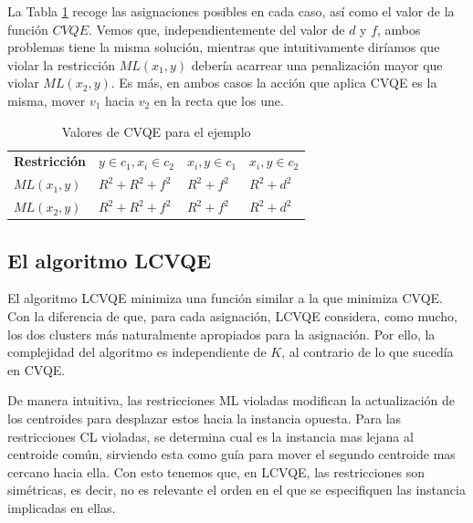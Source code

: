 La Tabla \ref{tab:tabla3} recoge las asignaciones posibles en cada caso, así como el valor de la función $CVQE$. Vemos que, independientemente del valor de $d$ y $f$, ambos problemas tiene la misma solución, mientras que intuitivamente diríamos que violar la restricción $ML(x_1, y)$ debería acarrear una penalización mayor que violar $ML(x_2, y)$. Es más, en ambos casos la acción que aplica \acs{CVQE} es la misma, mover $v_1$ hacia $v_2$ en la recta que los une.

\begin{table}[!h]
	\centering
	\setlength{\arrayrulewidth}{1mm}
	\setlength{\tabcolsep}{10pt}
	\renewcommand{\arraystretch}{0.9}
	
	\begin{tabular}{ >{\centering\arraybackslash}m{2cm}  >{\centering\arraybackslash}m{2.5cm}>{\centering\arraybackslash}m{2cm}>{\centering\arraybackslash}m{2cm}}
		\hline
		\rowcolor{black}
		\multicolumn{4}{c}{\bf \color{white}{Valores de CVQE}}\\
		\hline
		\rowcolor{gray!50}
		\textbf{Restricción} & \textbf{$y \in c_1, x_i \in c_2$} & \textbf{$x_i,y \in c_1$} & \textbf{$x_i,y \in c_2$}  \\
		$ML(x_1, y)$ & $R^2 + R^2 + f^2$ & $R^2 + f^2 $ & $R^2 + d^2 $  \\
		$ML(x_2, y)$ & $R^2 + R^2 + f^2$ & $R^2 + f^2 $ & $R^2 + d^2 $  \\
		\hline
		
	\end{tabular}
	\caption[Valores de CVQE para el ejemplo]{Valores de CVQE para el ejemplo \cite{CECM:2012}}
	\label{tab:tabla3}
\end{table}

\subsection{El algoritmo LCVQE}

El algoritmo \acs{LCVQE} minimiza una función similar a la que minimiza \acs{CVQE}. Con la diferencia de que, para cada asignación, \acs{LCVQE} considera, como mucho, los dos clusters más naturalmente apropiados para la asignación. Por ello, la complejidad del algoritmo es independiente de $K$, al contrario de lo que sucedía en \acs{CVQE}.

De manera intuitiva, las restricciones \acs{ML} violadas modifican la actualización de los centroides para desplazar estos hacia la instancia opuesta. Para las restricciones \acs{CL} violadas, se determina cual es la instancia mas lejana al centroide común, sirviendo esta como guía para mover el segundo centroide mas cercano hacia ella. Con esto tenemos que, en \acs{LCVQE}, las restricciones son simétricas, es decir, no es relevante el orden en el que se especifiquen las instancia implicadas en ellas.


